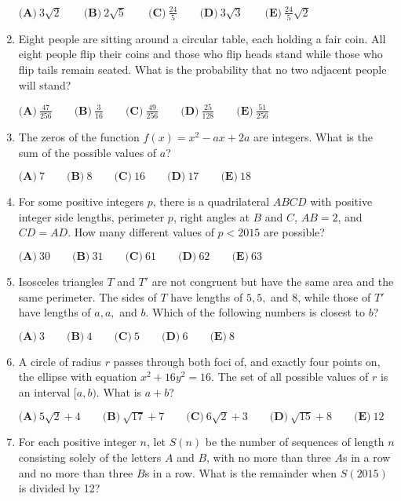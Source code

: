 \documentclass{article}
\begin{document}
\begin{enumerate}[label=\arabic*., itemsep=0.5em]
$ \textbf{(A)}\ 3\sqrt{2}\qquad\textbf{(B)}\ 2\sqrt{5}\qquad\textbf{(C)}\ \frac{24}{5}\qquad\textbf{(D)}\ 3\sqrt{3}\qquad\textbf{(E)}\ \frac{24}{5}\sqrt{2}$\par \vspace{0.5em}\item Eight people are sitting around a circular table, each holding a fair coin. All eight people flip their coins and those who flip heads stand while those who flip tails remain seated. What is the probability that no two adjacent people will stand?

$ \textbf{(A)}\ \frac{47}{256} \qquad\textbf{(B)}\ \frac{3}{16} \qquad\textbf{(C)}\ \frac{49}{256} \qquad\textbf{(D)}\ \frac{25}{128} \qquad\textbf{(E)}\ \frac{51}{256}$\par \vspace{0.5em}\item The zeros of the function $f(x) = x^2-ax+2a$ are integers. What is the sum of the possible values of $a$?

$ \textbf{(A)}\ 7 \qquad\textbf{(B)}\ 8 \qquad\textbf{(C)}\ 16 \qquad\textbf{(D)}\ 17 \qquad\textbf{(E)}\ 18$\par \vspace{0.5em}\item For some positive integers $p$, there is a quadrilateral $ABCD$ with positive integer side lengths, perimeter $p$, right angles at $B$ and $C$, $AB=2$, and $CD=AD$. How many different values of $p<2015$ are possible?

$ \textbf{(A)}\ 30 \qquad\textbf{(B)}\ 31 \qquad\textbf{(C)}\ 61 \qquad\textbf{(D)}\ 62 \qquad\textbf{(E)}\ 63$\par \vspace{0.5em}\item Isosceles triangles $T$ and $T'$ are not congruent but have the same area and the same perimeter. The sides of $T$ have lengths of $5,5,$ and $8$, while those of $T'$ have lengths of $a,a,$ and $b$. Which of the following numbers is closest to $b$?

$ \textbf{(A)}\ 3 \qquad\textbf{(B)}\ 4 \qquad\textbf{(C)}\ 5 \qquad\textbf{(D)}\ 6 \qquad\textbf{(E)}\ 8$\par \vspace{0.5em}\item A circle of radius $r$ passes through both foci of, and exactly four points on, the ellipse with equation $x^2+16y^2=16$. The set of all possible values of $r$ is an interval $[a,b)$. What is $a+b$?

$ \textbf{(A)}\ 5\sqrt{2}+4 \qquad\textbf{(B)}\ \sqrt{17}+7 \qquad\textbf{(C)}\ 6\sqrt{2}+3 \qquad\textbf{(D)}\ \sqrt{15}+8 \qquad\textbf{(E)}\ 12$\par \vspace{0.5em}\item For each positive integer $n$, let $S(n)$ be the number of sequences of length $n$ consisting solely of the letters $A$ and $B$, with no more than three $A$s in a row and no more than three $B$s in a row. What is the remainder when $S(2015)$ is divided by 12?


\end{enumerate}
\end{document}
